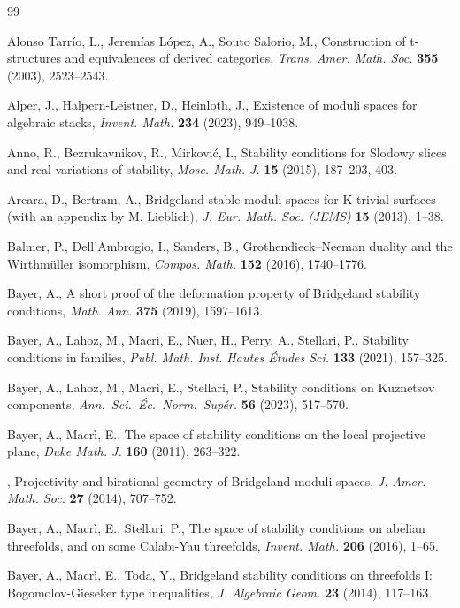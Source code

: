 \documentclass[11pt, reqno]{amsart}
\numberwithin{equation}{section}
\theoremstyle{plain}
\theoremstyle{remark}
\theoremstyle{definition}
\theoremstyle{italicsname}
\begin{document}
\begin{thebibliography}{99}

Alonso Tarr\'io, L., Jerem\'ias L\'opez, A., Souto Salorio, M., Construction of t-structures and equivalences of derived categories, {\it Trans. Amer. Math. Soc.} {\bf 355} (2003), 2523--2543.

Alper, J., Halpern-Leistner, D., Heinloth, J., Existence of moduli spaces for algebraic stacks, {\it Invent. Math.} {\bf 234} (2023), 949--1038.

Anno, R., Bezrukavnikov, R., Mirkovi\'c, I., Stability conditions for Slodowy slices and real variations of stability, {\it Mosc. Math. J.} {\bf 15} (2015), 187--203, 403.

Arcara, D., Bertram, A., Bridgeland-stable moduli spaces for K-trivial surfaces (with an appendix by M. Lieblich), {\it J. Eur. Math. Soc. (JEMS)} {\bf 15} (2013), 1--38.

Balmer, P., Dell'Ambrogio, I., Sanders, B., Grothendieck--{N}eeman duality and the {W}irthm\"uller isomorphism, {\it Compos. Math.} {\bf 152} (2016), 1740--1776.

Bayer, A., A short proof of the deformation property of Bridgeland stability conditions, {\it Math. Ann.} {\bf 375} (2019), 1597--1613.

Bayer, A., Lahoz, M., Macr\`i, E., Nuer, H., Perry, A., Stellari, P., Stability conditions in families, {\it Publ. Math. Inst. Hautes \'Etudes Sci.} {\bf 133} (2021), 157--325.

Bayer, A., Lahoz, M., Macr\`i, E., Stellari, P., Stability conditions on Kuznetsov components, {\it Ann.\ Sci.\ \'Ec.\ Norm.\ Sup\'er.} {\bf 56} (2023), 517--570.

Bayer, A., Macr\`i, E., The space of stability conditions on the local projective plane, {\it Duke Math. J.} {\bf 160} (2011), 263--322.

\bysame, Projectivity and birational geometry of Bridgeland moduli spaces, {\it J. Amer. Math. Soc.} {\bf 27} (2014), 707--752.

Bayer, A., Macr\`i, E., Stellari, P., The space of stability conditions on abelian threefolds, and on some {C}alabi-{Y}au threefolds, {\it Invent. Math.} {\bf 206} (2016), 1--65.

Bayer, A., Macr\`i, E., Toda, Y., Bridgeland stability conditions on threefolds I: Bogomolov-Gieseker type inequalities, {\it J. Algebraic Geom.} {\bf 23} (2014), 117--163.


\end{thebibliography}
\end{document}
